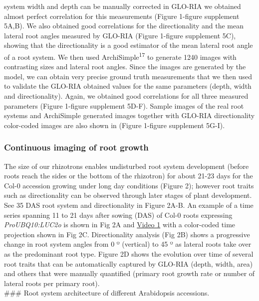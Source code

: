 \documentclass[]{article}
\begin{document}
system width and depth can be manually corrected in GLO-RIA we obtained
almost perfect correlation for this measurements (Figure 1-figure
supplement 5A,B). We also obtained good correlations for the
directionality and the mean lateral root angles measured by GLO-RIA
(Figure 1-figure supplement 5C), showing that the directionality is a
good estimator of the mean lateral root angle of a root system. We then
used ArchiSimple\textsuperscript{17} to generate 1240 images with
contrasting sizes and lateral root angles. Since the images are
generated by the model, we can obtain very precise ground truth
measurements that we then used to validate the GLO-RIA obtained values
for the same parameters (depth, width and directionality). Again, we
obtained good correlations for all three measured parameters (Figure
1-figure supplement 5D-F). Sample images of the real root systems and
ArchiSimple generated images together with GLO-RIA directionality
color-coded images are also shown in (Figure 1-figure supplement 5G-I).

\subsubsection{Continuous imaging of root
growth}\label{continuous-imaging-of-root-growth}

The size of our rhizotrons enables undisturbed root system development
(before roots reach the sides or the bottom of the rhizotron) for about
21-23 days for the Col-0 accession growing under long day conditions
(Figure 2); however root traits such as directionality can be observed
through later stages of plant development. See 35 DAS root system and
directionality in Figure 2A-B. An example of a time series spanning 11
to 21 days after sowing (DAS) of Col-0 roots expressing
\emph{ProUBQ10:LUC2o} is shown in Fig 2A and
\href{https://www.dropbox.com/s/sxjc04o0yj2faif/Video_1.avi?dl=0}{Video
1} with a color-coded time projection shown in Fig 2C. Directionality
analysis (Fig 2B) shows a progressive change in root system angles from
0 º (vertical) to 45 º as lateral roots take over as the predominant
root type. Figure 2D shows the evolution over time of several root
traits that can be automatically captured by GLO-RIA (depth, width,
area) and others that were manually quantified (primary root growth rate
or number of lateral roots per primary root).\\\#\#\# Root system
architecture of different Arabidopsis accessions.
\end{document}
